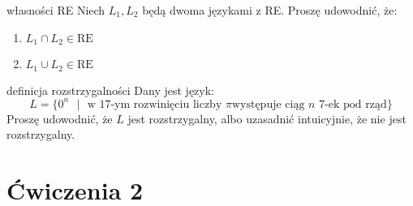 \begin{exercise}{własności RE}
Niech $L_1,L_2$ będą dwoma językami z RE. Proszę udowodnić, że:
\begin{enumerate}[label=(\alph*)]
    \item $L_1 \cap L_2 \in \text{RE}$
    \item $L_1 \cup L_2 \in \text{RE}$
\end{enumerate}
\end{exercise}

\begin{exercise}{definicja rozstrzygalności}
    Dany jest język:
    $$L=\{0^n\text{ } |\text{ } \text{w 17-ym rozwinięciu liczby }\pi \text{występuje ciąg }n \text{ 7-ek pod rząd}\}$$
Proszę udowodnić, że $L$ jest rozstrzygalny, albo uzasadnić intuicyjnie, że nie jest rozstrzygalny.
\end{exercise}

\section{Ćwiczenia 2}

